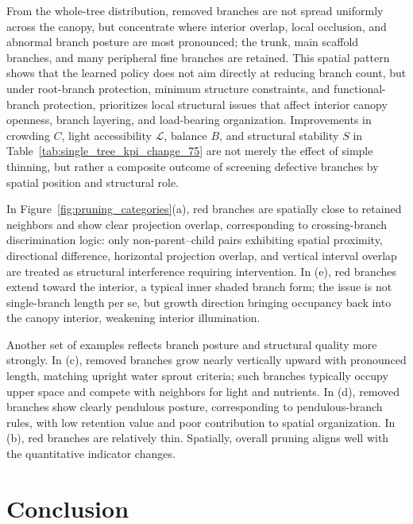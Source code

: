 \documentclass[12pt,a4paper,fontset=fandol]{ctexart}
\begin{document}
From the whole-tree distribution, removed branches are not spread uniformly across the canopy,
but concentrate where interior overlap, local occlusion, and abnormal branch posture are most pronounced;
the trunk, main scaffold branches, and many peripheral fine branches are retained.
This spatial pattern shows that the learned policy does not aim directly at reducing branch count,
but under root-branch protection, minimum structure constraints, and functional-branch protection,
prioritizes local structural issues that affect interior canopy openness, branch layering, and load-bearing organization.
Improvements in crowding $C$, light accessibility $\mathcal{L}$,
balance $B$, and structural stability $S$ in Table~\ref{tab:single_tree_kpi_change_75}
are not merely the effect of simple thinning,
but rather a composite outcome of screening defective branches by spatial position and structural role.

In Figure~\ref{fig:pruning_categories}(a), red branches are spatially close to  retained neighbors 
and show clear projection overlap, 
corresponding to crossing-branch discrimination logic: 
only non-parent--child pairs exhibiting spatial proximity, directional difference, horizontal projection overlap, and vertical interval overlap 
are treated as structural interference requiring intervention. 
In (e), red branches extend toward the interior, 
a typical inner shaded branch form; 
the issue is not single-branch length per se,
but growth direction bringing occupancy back into the canopy interior, weakening interior illumination.

Another set of examples reflects branch posture and structural quality more strongly.
In (c), removed branches grow nearly vertically upward
with pronounced length, matching upright water sprout criteria;
such branches typically occupy upper space and compete with neighbors for light and nutrients.
In (d), removed branches show clearly pendulous posture,
corresponding to pendulous-branch rules, with low retention value and poor contribution to spatial organization.
In (b), red branches are relatively thin.
Spatially, overall pruning aligns well with the quantitative indicator changes.




\section{Conclusion}\label{sec:conclusion}
\end{document}
